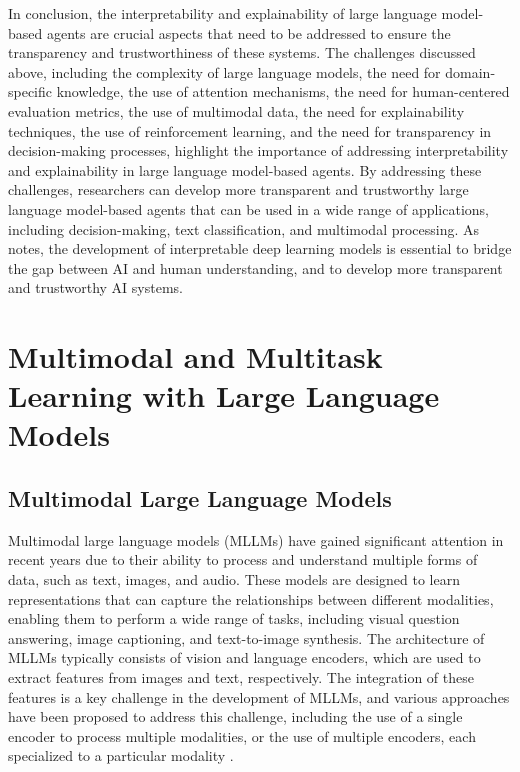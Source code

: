 \documentclass[11pt]{article}
\begin{document}
In conclusion, the interpretability and explainability of large language model-based agents are crucial aspects that need to be addressed to ensure the transparency and trustworthiness of these systems. The challenges discussed above, including the complexity of large language models, the need for domain-specific knowledge, the use of attention mechanisms, the need for human-centered evaluation metrics, the use of multimodal data, the need for explainability techniques, the use of reinforcement learning, and the need for transparency in decision-making processes, highlight the importance of addressing interpretability and explainability in large language model-based agents. By addressing these challenges, researchers can develop more transparent and trustworthy large language model-based agents that can be used in a wide range of applications, including decision-making, text classification, and multimodal processing. As \cite{ref273} notes, the development of interpretable deep learning models is essential to bridge the gap between AI and human understanding, and to develop more transparent and trustworthy AI systems.

\section{Multimodal and Multitask Learning with Large Language Models}

\subsection{Multimodal Large Language Models}

Multimodal large language models (MLLMs) have gained significant attention in recent years due to their ability to process and understand multiple forms of data, such as text, images, and audio. These models are designed to learn representations that can capture the relationships between different modalities, enabling them to perform a wide range of tasks, including visual question answering, image captioning, and text-to-image synthesis. The architecture of MLLMs typically consists of vision and language encoders, which are used to extract features from images and text, respectively. The integration of these features is a key challenge in the development of MLLMs, and various approaches have been proposed to address this challenge, including the use of a single encoder to process multiple modalities, or the use of multiple encoders, each specialized to a particular modality \cite{ref274}.
\end{document}
